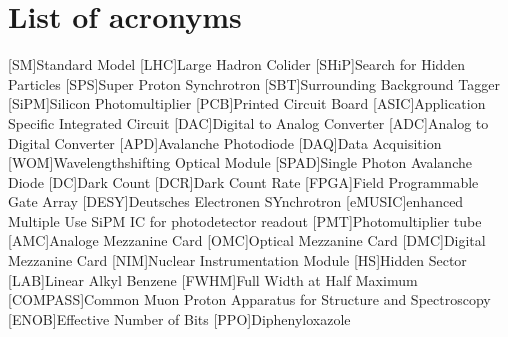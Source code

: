 \documentclass[listof=totoc,bibliography=totocnumbered,a4paper,english,12pt,twoside]{report}
\begin{document}
\onehalfspacing





\newpage
\thispagestyle{empty}
\mbox{}\newpage
{}

\thispagestyle{empty}
\mbox{}\newpage
\thispagestyle{empty}


\thispagestyle{empty}
\newpage
\thispagestyle{empty}
\mbox{}\newpage

\setcounter{page}{1}
\tableofcontents

\newpage







\appendix

\chapter{List of acronyms}
\begin{acronym}[SiPM]
    [SM]{Standard Model}
    [LHC]{Large Hadron Colider}
    [SHiP]{Search for Hidden Particles}
    [SPS]{Super Proton Synchrotron}
    [SBT]{Surrounding Background Tagger}
    [SiPM]{Silicon Photomultiplier}
    [PCB]{Printed Circuit Board}
    [ASIC]{Application Specific Integrated Circuit}
    [DAC]{Digital to Analog Converter}
    [ADC]{Analog to Digital Converter}
    [APD]{Avalanche Photodiode}
    [DAQ]{Data Acquisition}
    [WOM]{Wavelengthshifting Optical Module}
    [SPAD]{Single Photon Avalanche Diode}
    [DC]{Dark Count}
    [DCR]{Dark Count Rate}
    [FPGA]{Field Programmable Gate Array}
    [DESY]{Deutsches Electronen SYnchrotron}
    [eMUSIC]{enhanced Multiple Use SiPM IC for photodetector readout}
    [PMT]{Photomultiplier tube}
    [AMC]{Analoge Mezzanine Card}
    [OMC]{Optical Mezzanine Card}
    [DMC]{Digital Mezzanine Card}
    [NIM]{Nuclear Instrumentation Module}
    [HS]{Hidden Sector}
    [LAB]{Linear Alkyl Benzene}
    [FWHM]{Full Width at Half Maximum}
    [COMPASS]{Common Muon Proton Apparatus for Structure and Spectroscopy}
    [ENOB]{Effective Number of Bits}
    [PPO]{Diphenyloxazole}
\end{acronym}
\end{document}
